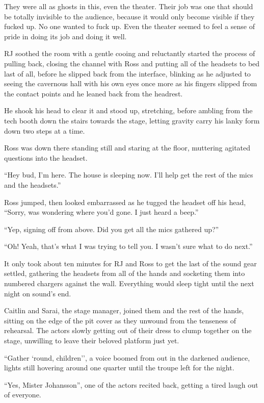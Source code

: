 They were all as ghosts in this, even the theater.  Their job was one that should be totally invisible to the audience, because it would only become visible if they fucked up.  No one wanted to fuck up.  Even the theater seemed to feel a sense of pride in doing its job and doing it well.

RJ soothed the room with a gentle cooing and reluctantly started the process of pulling back, closing the channel with Ross and putting all of the headsets to bed last of all, before he slipped back from the interface, blinking as he adjusted to seeing the cavernous hall with his own eyes once more as his fingers slipped from the contact points and he leaned back from the headrest.

He shook his head to clear it and stood up, stretching, before ambling from the tech booth down the stairs towards the stage, letting gravity carry his lanky form down two steps at a time.

Ross was down there standing still and staring at the floor, muttering agitated questions into the headset.

``Hey bud, I'm here.  The house is sleeping now.  I'll help get the rest of the mics and the headsets.''

Ross jumped, then looked embarrassed as he tugged the headset off his head, ``Sorry, was wondering where you'd gone.  I just heard a beep.''

``Yep, signing off from above.  Did you get all the mics gathered up?''

``Oh! Yeah, that's what I was trying to tell you.  I wasn't sure what to do next.''

It only took about ten minutes for RJ and Ross to get the last of the sound gear settled, gathering the headsets from all of the hands and socketing them into numbered chargers against the wall.  Everything would sleep tight until the next night on sound's end.

Caitlin and Sarai, the stage manager, joined them and the rest of the hands, sitting on the edge of the pit cover as they unwound from the tenseness of rehearsal.  The actors slowly getting out of their dress to clump together on the stage, unwilling to leave their beloved platform just yet.

``Gather `round, children'', a voice boomed from out in the darkened audience, lights still hovering around one quarter until the troupe left for the night.

``Yes, Mister Johansson'', one of the actors recited back, getting a tired laugh out of everyone.

